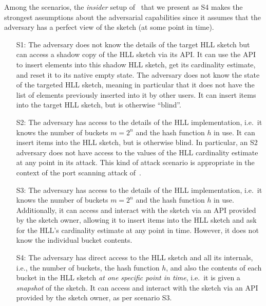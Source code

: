 \documentclass[sigconf, anonymous, dvipsnames]{acmart} %
\begin{document}
Among the scenarios, the \textit{insider} setup of~\cite{cardestprivacy} that we present as S4 makes the strongest assumptions about the adversarial capabilities since it assumes that the adversary has a perfect view of the sketch (at some point in time).

\begin{itemize}
\item[S1:] The adversary does not know the details of the target HLL sketch but can access a shadow copy of the HLL sketch via its API. It can use the API to insert elements into this shadow HLL sketch, get its cardinality estimate, and reset it to its native empty state. The adversary does not know the state of the targeted HLL sketch, meaning in particular that it does not have the list of elements previously inserted into it by other users. It can insert items into the target HLL sketch, but is otherwise ``blind''. 
\item[S2:] The adversary has access to the details of the HLL implementation, i.e.\ it knows the number of buckets $m=2^n$ and the hash function $h$ in use. It can insert items into the HLL sketch, but is otherwise blind. In particular, an S2 adversary does not have access to the values of the HLL cardinality estimate at any point in its attack. This kind of attack scenario is appropriate in the context of the port scanning attack of~\cite{portscanhll}.
\item[S3:] The adversary has access to the details of the HLL implementation, i.e.\ it knows the number of buckets $m=2^n$ and the hash function $h$ in use. Additionally, it can access and interact with the sketch via an API provided by the sketch owner, allowing it to insert items into the HLL sketch and ask for the HLL's cardinality estimate at any point in time. However, it does not know the individual bucket contents.
\item[S4:] The adversary has direct access to the HLL sketch and all its internals, i.e., the number of buckets, the hash function $h$, and also the contents of each bucket in the HLL sketch \emph{at one specific point in time}, i.e.\ it is given a \emph{snapshot} of the sketch. It can access and interact with the sketch via an API provided by the sketch owner, as per scenario S3. 
\end{itemize}
\end{document}
